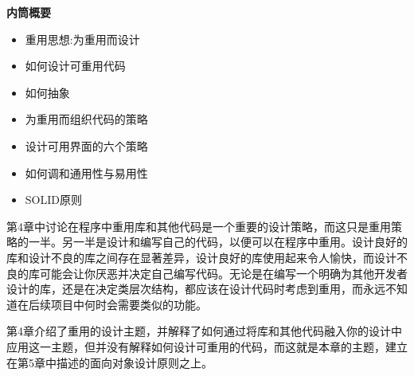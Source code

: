 \noindent
\textbf{内筒概要}

\begin{itemize}
\item
重用思想:为重用而设计

\item
如何设计可重用代码

\item
如何抽象

\item
为重用而组织代码的策略

\item
设计可用界面的六个策略

\item
如何调和通用性与易用性

\item
SOLID原则
\end{itemize}

第4章中讨论在程序中重用库和其他代码是一个重要的设计策略，而这只是重用策略的一半。另一半是设计和编写自己的代码，以便可以在程序中重用。设计良好的库和设计不良的库之间存在显著差异，设计良好的库使用起来令人愉快，而设计不良的库可能会让你厌恶并决定自己编写代码。无论是在编写一个明确为其他开发者设计的库，还是在决定类层次结构，都应该在设计代码时考虑到重用，而永远不知道在后续项目中何时会需要类似的功能。

第4章介绍了重用的设计主题，并解释了如何通过将库和其他代码融入你的设计中应用这一主题，但并没有解释如何设计可重用的代码，而这就是本章的主题，建立在第5章中描述的面向对象设计原则之上。
